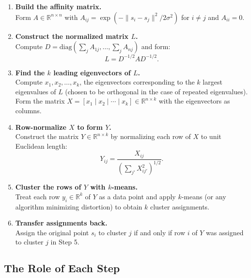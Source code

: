 \documentclass[11pt]{article}
\theoremstyle{plain}
\theoremstyle{definition}
\begin{document}
\begin{enumerate}[label=\textbf{Step \arabic*.}, leftmargin=*, itemsep=8pt]
    \item \textbf{Build the affinity matrix.}\\
    Form $A \in \mathbb{R}^{n \times n}$ with $A_{ij} = \exp(-\|s_i - s_j\|^2 / 2\sigma^2)$ for $i \neq j$ and $A_{ii} = 0$.

    \item \textbf{Construct the normalized matrix $L$.}\\
    Compute $D = \mathrm{diag}(\sum_j A_{1j}, \ldots, \sum_j A_{nj})$ and form:
    \[
        L = D^{-1/2} A D^{-1/2}.
    \]

    \item \textbf{Find the $k$ leading eigenvectors of $L$.}\\
    Compute $x_1, x_2, \ldots, x_k$, the eigenvectors corresponding to the $k$ largest eigenvalues of $L$ (chosen to be orthogonal in the case of repeated eigenvalues). Form the matrix $X = [x_1 \mid x_2 \mid \cdots \mid x_k] \in \mathbb{R}^{n \times k}$ with the eigenvectors as columns.

    \item \textbf{Row-normalize $X$ to form $Y$.}\\
    Construct the matrix $Y \in \mathbb{R}^{n \times k}$ by normalizing each row of $X$ to unit Euclidean length:
    \begin{equation}
        Y_{ij} = \frac{X_{ij}}{\left(\sum_{j'} X_{ij'}^2\right)^{1/2}}.
        \label{eq:rownorm}
    \end{equation}

    \item \textbf{Cluster the rows of $Y$ with $k$-means.}\\
    Treat each row $y_i \in \mathbb{R}^k$ of $Y$ as a data point and apply $k$-means (or any algorithm minimizing distortion) to obtain $k$ cluster assignments.

    \item \textbf{Transfer assignments back.}\\
    Assign the original point $s_i$ to cluster $j$ if and only if row $i$ of $Y$ was assigned to cluster $j$ in Step 5.
\end{enumerate}

\subsection{The Role of Each Step}
\end{document}

